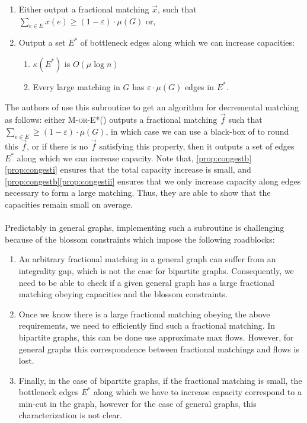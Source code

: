 \documentclass[a4paper,11pt]{article}
\newcommand{\eps}{\varepsilon}
\theoremstyle{definition}
\theoremstyle{definition}
\theoremstyle{definition}
\theoremstyle{definition}
\theoremstyle{definition}
\theoremstyle{definition}
\theoremstyle{definition}
\theoremstyle{definition}
\theoremstyle{definition}
\theoremstyle{definition}
\theoremstyle{definition}
\theoremstyle{definition}
\theoremstyle{definition}
\theoremstyle{definition}
\theoremstyle{definition}
\begin{document}
\begin{enumerate}
\item Either output a fractional matching $\vec{x}$, such that $\sum_{e\in E}x(e)\geqslant (1-\eps)\cdot \mu(G)$ or,
\item Output a set $E^*$ of bottleneck edges along which we can increase capacities: \label{prop:congestb}
\begin{enumerate}[label=(\roman*)]
\item $\kappa(E^*)$ is $O(\mu\log n)$\label{prop:congesti}
\item Every large matching in $G$ has $\eps\cdot\mu(G)$ edges in $E^*$. \label{prop:congestii}
\end{enumerate}
\end{enumerate} 
The authors of \cite{BPT20} use this subroutine to get an algorithm for decremental matching as follows: either \textsc{M-or-E*}() outputs a fractional matching $\vec{f}$ such that $\sum_{e\in E}\geqslant (1-\eps)\cdot \mu(G)$, in which case we can use a black-box of \cite{Wajc2020} to round this $\vec{f}$, or if there is no $\vec{f}$ satisfying this property, then it outputs a set of edges $E^*$ along which we can increase capacity. Note that, \ref{prop:congestb}\ref{prop:congesti} ensures that the total capacity increase is small, and \ref{prop:congestb}\ref{prop:congestii} ensures that we only increase capacity along edges necessary to form a large matching. Thus, they are able to show that the capacities remain small on average. \\ \\
Predictably in general graphs, implementing such a subroutine is challenging because of the blossom constraints which impose the following roadblocks:
\begin{enumerate}
\item An arbitrary fractional matching in a general graph can suffer from an integrality gap, which is not the case for bipartite graphs. Consequently, we need to be able to check if a given general graph has a large fractional matching obeying capacities and the blossom constraints. \label{item:issuea}
\item Once we know there is a large fractional matching obeying the above requirements, we need to efficiently find such a fractional matching. In bipartite graphs, this can be done use approximate max flows. However, for general graphs this correspondence between fractional matchings and flows is lost. \label{item:issueb}
\item Finally, in the case of bipartite graphs, if the fractional matching is small, the bottleneck edges $E^*$ along which we have to increase capacity correspond to a min-cut in the graph, however for the case of general graphs, this characterization is not clear.\label{item:issuec}
\end{enumerate}
\end{document}
